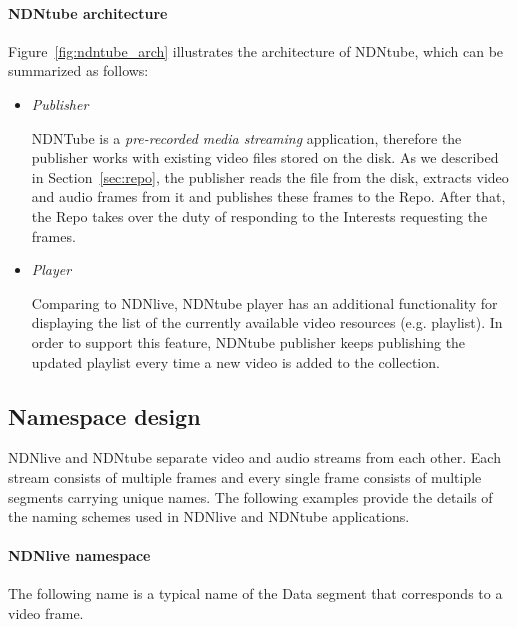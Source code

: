\paragraph{NDNtube architecture} %
\vspace{0.3cm}
\label{par:ndntube_arch}
Figure~\ref{fig:ndntube_arch} illustrates the architecture of NDNtube, which can be summarized as follows:
\begin{itemize}
  \item \textit{Publisher}

    NDNTube is a \textit{pre-recorded media streaming} application, therefore the publisher works with existing video files stored on the disk. As we described in Section~\ref{sec:repo}, the publisher reads the file from the disk, extracts video and audio frames from it and publishes these frames to the Repo. After that, the Repo takes over the duty of responding to the Interests requesting the frames. 

  \item \textit{Player}

    Comparing to NDNlive, NDNtube player has an additional functionality for displaying the list of the currently available video resources (e.g. playlist). In order to support this feature, NDNtube publisher keeps publishing the updated playlist every time a new video is added to the collection.

\end{itemize}


\subsection{Namespace design}

NDNlive and NDNtube separate video and audio streams from each other. Each stream consists of multiple frames and every single frame consists of multiple segments carrying unique names. The following examples provide the details of the naming schemes used in NDNlive and NDNtube applications.

\paragraph{NDNlive namespace} %
\label{par:ndnlive_naming}
\vspace{0.3cm}
The following name is a typical name of the Data segment that corresponds to a video frame.

